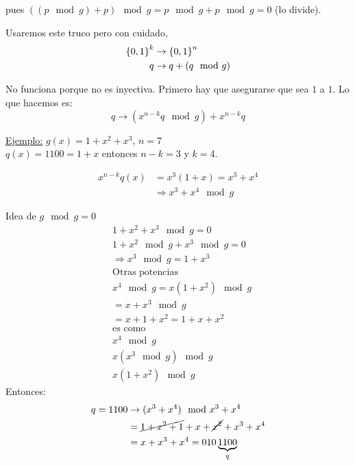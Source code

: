 \documentclass[12pt,a4paper]{article}
\begin{document}
pues $((p \mod g) + p) \mod g = p \mod g + p \mod g = 0$ (lo divide).
\medskip

Usaremos este truco pero con cuidado,
\begin{align*}
    \left\lbrace 0,1 \right\rbrace^{k} &\to \left\lbrace 0,1 \right\rbrace^{n} \\
    q &\to q + (q \mod g)\\
\end{align*}

No funciona porque no es inyectiva. Primero hay que asegurarse que sea $1$ a $1$. 
Lo que hacemos es:
$$q \to (x^{n-k}q \mod g) + x^{n-k}q$$

\underline{Ejemplo:} $g(x) = 1+x^{2}+x^{3}$, $n=7$\\
$q(x) = 1100 = 1+x$ entonces $n-k = 3$ y $k = 4$.

\begin{align*}
    x^{n-k}q(x) &= x^{3}(1+x) = x^{3} + x^{4}\\
    &\Rightarrow x^{3} + x^{4} \mod g
\end{align*}

Idea de $g \mod g = 0$
\begin{align*}
    &1+x^{2}+x^{3} \mod g = 0\\
    &1 + x^{2} \mod g + x^{3} \mod g = 0\\
    &\Rightarrow x^{3} \mod g = 1 + x^{3}\\
    &\text{Otras potencias}\\
    &x^{4} \mod g = x(1+x^{2}) \mod g\\
    &= x + x^{3} \mod g\\
    &= x + 1 + x^{2} = 1 + x + x^{2}\\
    &\text{es como}\\
    &x^{4} \mod g \\
    &x(x^{3} \mod g) \mod g\\
    &x(1+ x^{2}) \mod g
\end{align*}
Entonces:
\begin{align*}
    q = 1100 &\to (x^{3} + x^{4}) \mod x^{3} + x^{4}\\
    &= \cancel{1+x^{2}+1}+x+\cancel{x^{2}}+x^{3} + x^{4}\\
    &= x + x^{3} + x^{4} = 010\underbrace{1100}_{q}\\ 
\end{align*}
\end{document}
